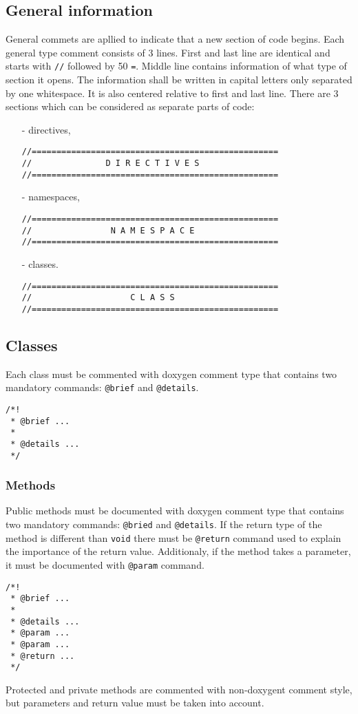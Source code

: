 \documentclass[10pt,a4paper]{article}
\begin{document}
\subsection{General information}\label{general}
\noindent General commets are apllied to indicate that a new section of code begins. Each general type comment consists of 3 lines. First and last line are identical and starts with \verb+//+ followed by 50 \verb+=+. Middle line contains information of what type of section it opens. The information shall be written in capital letters only separated by one whitespace. It is also centered relative to first and last line. There are 3 sections which can be considered as separate parts of code:
\begin{itemize}
	\item[-] directives,
\begin{Verbatim}[frame=single]
//==================================================
//               D I R E C T I V E S
//==================================================
\end{Verbatim}
	\item[-] namespaces,
\begin{Verbatim}[frame=single]
//==================================================
//                N A M E S P A C E
//==================================================
\end{Verbatim}
	\item[-] classes.
\begin{Verbatim}[frame=single]
//==================================================
//                    C L A S S
//==================================================
\end{Verbatim}
\end{itemize}

\subsection{Classes}\label{classes}
\noindent Each class must be commented with doxygen comment type that contains two mandatory commands: \verb+@brief+ and \verb+@details+.
\begin{Verbatim}[frame=single]
/*!
 * @brief ...
 *
 * @details ...
 */
\end{Verbatim}
\subsubsection{Methods}
\noindent\label{public-methods}Public methods must be documented with doxygen comment type that contains two mandatory commands: \verb+@bried+ and \verb+@details+. If the return type of the method is different than \verb+void+ there must be \verb+@return+ command used to explain the importance of the return value. Additionaly, if the method takes a parameter, it must be documented with \verb+@param+ command.
\begin{Verbatim}[frame=single]
/*!
 * @brief ...
 *
 * @details ...
 * @param ...
 * @param ...
 * @return ... 
 */
\end{Verbatim}
\label{private-methods}Protected and private methods are commented with non-doxygent comment style, but parameters and return value must be taken into account.
\end{document}
